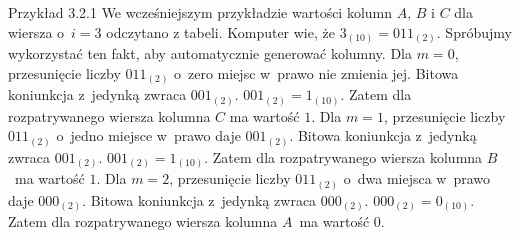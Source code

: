 \documentclass{SGGW-thesis}
\begin{document}
\begin{paragraph}{Przykład 3.2.1\label{ex:3.2.3}}
    We wcześniejszym przykładzie wartości kolumn $A$, $B$ i $C$ dla wiersza o~$i = 3$ odczytano z tabeli. Komputer wie, że $3_{(10)} = 011_{(2)}$. Spróbujmy wykorzystać ten fakt, aby automatycznie generować kolumny. Dla $m=0$, przesunięcie liczby $011_{(2)}$ o~zero miejsc w~prawo nie zmienia jej. Bitowa koniunkcja z~jedynką zwraca $001_{(2)}$. $001_{(2)} = 1_{(10)}$. Zatem dla rozpatrywanego wiersza kolumna $C$ ma wartość $1$. Dla $m=1$, przesunięcie liczby $011_{(2)}$ o~jedno miejsce w~prawo daje $001_{(2)}$. Bitowa koniunkcja z~jedynką zwraca $001_{(2)}$. $001_{(2)} = 1_{(10)}$. Zatem dla rozpatrywanego wiersza kolumna $B$~ma wartość $1$. Dla $m=2$, przesunięcie liczby $011_{(2)}$ o~dwa miejsca w~prawo daje $000_{(2)}$. Bitowa koniunkcja z~jedynką zwraca $000_{(2)}$. $000_{(2)} = 0_{(10)}$. Zatem dla rozpatrywanego wiersza kolumna $A$~ma wartość $0$.
\end{paragraph}
\end{document}
